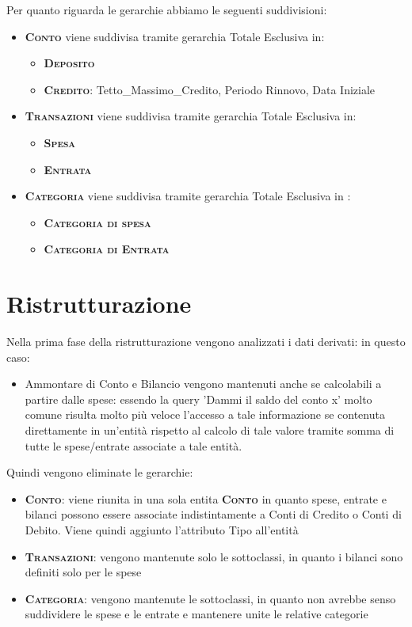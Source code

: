 \documentclass[a4paper,10pt]{article}
\newcommand{\entita}[1]{\textsc{\textbf{#1}}}
\newcommand{\attr}[1]{\textsf{#1}}
\begin{document}
Per quanto riguarda le gerarchie abbiamo le seguenti suddivisioni:
\begin{itemize}
\item \entita{Conto} viene suddivisa tramite gerarchia Totale Esclusiva in: \begin{itemize}\item\entita{Deposito} \item\entita{Credito}: \attr{Tetto\_{}Massimo\_{}Credito, Periodo Rinnovo, Data Iniziale}
\end{itemize}
\item \entita{Transazioni} viene suddivisa tramite gerarchia Totale Esclusiva in: \begin{itemize}\item\entita{Spesa}\item\entita{Entrata}\end{itemize}
\item \entita{Categoria} viene suddivisa tramite gerarchia Totale Esclusiva in : \begin{itemize}\item\entita{Categoria di spesa}\item\entita{Categoria di Entrata}\end{itemize}
\end{itemize}

\section{Ristrutturazione}
Nella prima fase della ristrutturazione vengono analizzati i dati derivati: in questo caso:
\begin{itemize}
\item \attr{Ammontare} di Conto e Bilancio vengono mantenuti anche se calcolabili a partire dalle spese: essendo la query 'Dammi il saldo del conto x' molto comune risulta molto più veloce l'accesso a tale informazione se contenuta direttamente in un'entità rispetto al calcolo di tale valore tramite somma di tutte le spese/entrate associate a tale entità.
\end{itemize}

Quindi vengono eliminate le gerarchie:
\begin{itemize}
\item \entita{Conto}: viene riunita in una sola entita \entita{Conto} in quanto spese, entrate e bilanci possono essere associate indistintamente a Conti di Credito o Conti di Debito. Viene quindi aggiunto l'attributo \attr{Tipo} all'entità
\item \entita{Transazioni}: vengono mantenute solo le sottoclassi, in quanto  i bilanci sono definiti solo per le spese
\item \entita{Categoria}: vengono mantenute le sottoclassi, in quanto non avrebbe senso suddividere le spese e le entrate e mantenere unite le relative categorie
\end{itemize}
\end{document}

